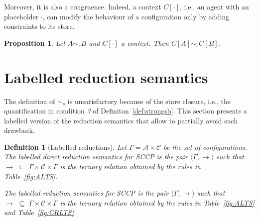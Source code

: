 \documentclass[preprint,12pt]{elsarticle}
\newtheorem{definition}{Definition}
\newtheorem{proposition}{Proposition}
\def\C{{\mathcal C}}
\newcommand{\rarrow}{\rightarrow}
\def\C{{\mathcal C}}
\begin{document}
Moreover, it is also a congruence. Indeed, a context $C[\cdot]$, i.e., an agent with an placeholder $\cdot$,
can modify the behaviour of a configuration only by adding constraints to its store. 

\begin{proposition}
	\label{cong1}
	Let $A \sim_{\mathit{s}} B$ and $C[\cdot]$ a context.
	Then $C[A] \sim_{\mathit{s}} C[B]$.
\end{proposition}



\section{Labelled reduction semantics}\label{sec:labelled}
The definition of $\sim_{\mathit{s}}$ 
is unsatisfactory
because of the store closure, i.e., the quantification in condition \emph{3} of 
Definiton~\ref{def:strongsb}.
This section presents a labelled version of the reduction semantics that 
allow to partially 
avoid such drawback.

\begin{definition}[Labelled reductions]
	Let $\Gamma = {\mathcal A} \times \C$ be the set of \emph{configurations}.
	The  \emph{labelled direct reduction semantics} for SCCP is the pair 
	$\langle \Gamma,   \xrightarrow{ }  \rangle$
	such that $\to \, \, \subseteq \, \,\Gamma \times \mathcal{C} \times \Gamma$ is the ternary
	relation obtained by the rules in Table~\ref{fig:ALTS}.
	
	The \emph{labelled reduction semantics} for SCCP is the pair 
	$\langle \Gamma,  \rightarrow \rangle$
	such that $\rarrow \, \, \subseteq \, \,\Gamma \times \mathcal{C} \times  \Gamma$ is the ternary relation
	obtained by the rules in Table~\ref{fig:ALTS} and Table~\ref{fig:CRLTS}.
\end{definition}
\end{document}
